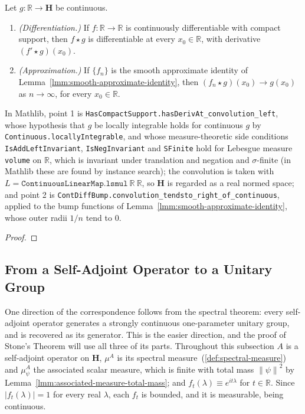 \begin{lemma}
    \label{lmm:convolution-facts}
    \leanok
    Let $g : \mathbb{R} \rightarrow \mathbf{H}$ be continuous.
    \begin{enumerate}
        \item \textit{(Differentiation.)} If $f : \mathbb{R} \rightarrow \mathbb{R}$ is continuously differentiable with compact support, then $f \star g$ is differentiable at every $x_0 \in \mathbb{R}$, with derivative $(f' \star g)(x_0)$.
        \item \textit{(Approximation.)} If $\{f_n\}$ is the smooth approximate identity of Lemma~\ref{lmm:smooth-approximate-identity}, then $(f_n \star g)(x_0) \to g(x_0)$ as $n \to \infty$, for every $x_0 \in \mathbb{R}$.
    \end{enumerate}
    In Mathlib, point 1 is \texttt{HasCompactSupport.hasDerivAt\_convolution\_left}, whose hypothesis that $g$ be locally integrable holds for continuous $g$ by \texttt{Continuous.locallyIntegrable}, and whose measure-theoretic side conditions \texttt{IsAddLeftInvariant}, \texttt{IsNegInvariant} and \texttt{SFinite} hold for Lebesgue measure \texttt{volume} on $\mathbb{R}$, which is invariant under translation and negation and $\sigma$-finite (in Mathlib these are found by instance search); the convolution is taken with $L = \texttt{ContinuousLinearMap.lsmul}\ \mathbb{R}\ \mathbb{R}$, so $\mathbf{H}$ is regarded as a real normed space; and point 2 is \texttt{ContDiffBump.convolution\_tendsto\_right\_of\_continuous}, applied to the bump functions of Lemma~\ref{lmm:smooth-approximate-identity}, whose outer radii $1/n$ tend to $0$.
\end{lemma}
\begin{proof}
\leanok
\end{proof}

\subsection{From a Self-Adjoint Operator to a Unitary Group}
One direction of the correspondence follows from the spectral theorem: every self-adjoint operator generates a strongly continuous one-parameter unitary group, and is recovered as its generator. This is the easier direction, and the proof of Stone's Theorem will use all three of its parts. Throughout this subsection $A$ is a self-adjoint operator on $\mathbf{H}$, $\mu^A$ is its spectral measure~(\ref{def:spectral-measure}) and $\mu^A_\psi$ the associated scalar measure, which is finite with total mass $\left\| \psi \right\|^2$ by Lemma~\ref{lmm:associated-measure-total-mass}; and $f_t(\lambda) \equiv e^{it\lambda}$ for $t \in \mathbb{R}$. Since $\lvert f_t(\lambda) \rvert = 1$ for every real $\lambda$, each $f_t$ is bounded, and it is measurable, being continuous.

